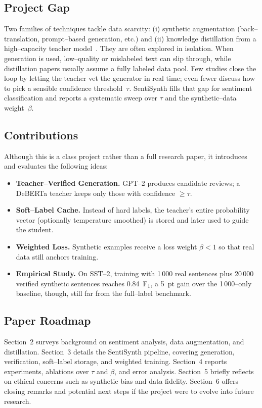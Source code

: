 \documentclass[11pt]{article}
\begin{document}
\subsection{Project Gap}
Two families of techniques tackle data scarcity: (i) synthetic
augmentation (back--translation, prompt--based generation, etc.) and
(ii) knowledge distillation from a high--capacity teacher
model~\cite{CITATION_NEEDED}.  They are often explored in isolation.
When generation is used, low--quality or mislabeled text can slip
through, while distillation papers usually assume a fully labeled data
pool.  Few studies close the loop by letting the teacher vet the
generator in real time; even fewer discuss how to pick a sensible
confidence threshold~$\tau$.  SentiSynth fills that gap for sentiment
classification and reports a systematic sweep over $\tau$ and the
synthetic--data weight~$\beta$.

\subsection{Contributions}
Although this is a class project rather than a full research paper,
it introduces and evaluates the following ideas:
\begin{itemize}
  \item \textbf{Teacher--Verified Generation.}  GPT--2 produces
    candidate reviews; a DeBERTa teacher keeps only those with
    confidence $\ge \tau$.
  \item \textbf{Soft--Label Cache.}  Instead of hard labels, the
    teacher's entire probability vector (optionally temperature
    smoothed) is stored and later used to guide the student.
  \item \textbf{Weighted Loss.}  Synthetic examples receive a loss
    weight $\beta<1$ so that real data still anchors training.
  \item \textbf{Empirical Study.}  On SST--2, training with 1\,000 real
    sentences plus 20\,000 verified synthetic sentences reaches
    0.84~F$_1$, a 5~pt gain over the 1\,000--only baseline, though,
    still far from the full--label benchmark.
\end{itemize}

\subsection{Paper Roadmap}
Section~2 surveys background on sentiment analysis, data augmentation,
and distillation.  Section~3 details the SentiSynth pipeline, covering
generation, verification, soft--label storage, and weighted training.
Section~4 reports experiments, ablations over $\tau$ and $\beta$, and
error analysis.  Section~5 briefly reflects on ethical concerns such
as synthetic bias and data fidelity.  Section~6 offers closing remarks
and potential next steps if the project were to evolve into future
research.
\end{document}
